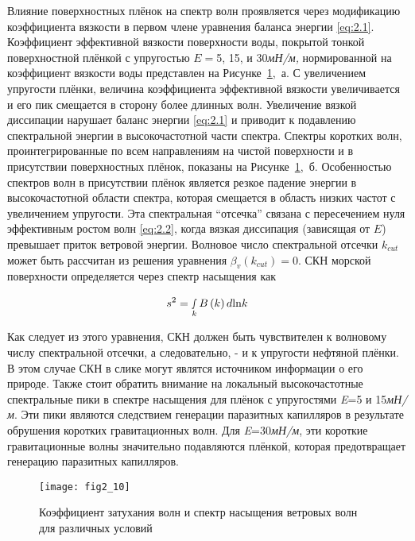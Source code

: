 Влияние поверхностных плёнок на спектр волн проявляется через модификацию коэффициента вязкости в первом члене уравнения баланса энергии \eqref{eq:2.1}.
Коэффициент эффективной вязкости поверхности воды, покрытой тонкой поверхностной плёнкой с упругостью $E=$5, 15, и 30\textit{мН/м,} нормированной на коэффициент вязкости воды представлен на Рисунке~\ref{fig:2.10},~а. С увеличением упругости плёнки, величина коэффициента эффективной вязкости увеличивается и его пик смещается в сторону более длинных волн. Увеличение вязкой диссипации нарушает баланс энергии \eqref{eq:2.1} и приводит к подавлению спектральной энергии в высокочастотной части спектра. Спектры коротких волн, проинтегрированные по всем направлениям на чистой поверхности и в присутствии поверхностных плёнок, показаны на Рисунке~\ref{fig:2.10},~б. Особенностью спектров волн в присутствии плёнок является резкое падение энергии в высокочастотной области спектра, которая смещается в область низких частот с увеличением упругости. Эта спектральная ``отсечка'' связана с пересечением нуля эффективным ростом волн \eqref{eq:2.2}, когда вязкая диссипация (зависящая от $E$) превышает приток ветровой энергии. Волновое число спектральной отсечки $k_{cut} $ может быть рассчитан из решения уравнения $\beta _{v} (k_{cut} )=0$. СКН морской поверхности определяется через спектр насыщения как



\begin{equation} \label{eq:2.3} 
s^{2} =\mathop{\smallint }\limits_{k}^{} B\left(k\right)d{\rm ln}k 
\end{equation} 


Как следует из этого уравнения, СКН должен быть чувствителен к волновому числу спектральной отсечки, а следовательно, - и к упругости нефтяной плёнки. В этом случае СКН в слике могут являтся источником информации о его природе. Также стоит обратить внимание на локальный высокочастотные спектральные пики в спектре насыщения для плёнок с упругостями \textit{E}=5 и 15\textit{мН/м}. Эти пики являются следствием генерации паразитных капилляров в результате обрушения коротких гравитационных волн. Для \textit{E}=30\textit{мН/м}, эти короткие гравитационные волны значительно подавляются плёнкой, которая предотвращает генерацию паразитных капилляров.



\begin{figure}[!ht]
   	\centering
	{\texttt{[image: fig2\_10]}}
    \\
    \caption{Коэффициент затухания волн и спектр насыщения ветровых волн для различных условий}
    \label{fig:2.10}
\end{figure}


